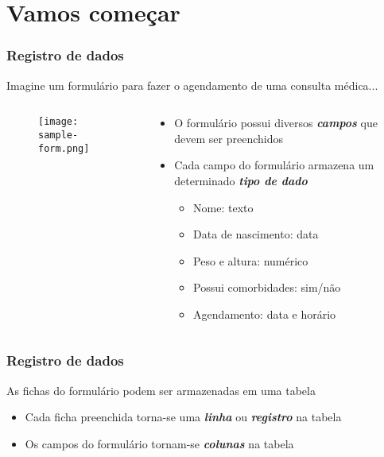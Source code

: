 \documentclass[t, 10pt, aspectratio=169, table, x11names]{beamer}
\begin{document}
	\section{Vamos começar}
	
	\begin{frame}
		\frametitle{Registro de dados}
		\vspace{3mm}
		Imagine um formulário para fazer o agendamento de uma consulta médica...
		\begin{columns}[t]
			\begin{column}{0.50\textwidth}
				\vspace{0.3cm}
				\begin{figure}[h]
					\texttt{[image: sample-form.png]}
				\end{figure}
			\end{column}
			\begin{column}{0.53\textwidth}
				\begin{itemize}					
					\item O formulário possui diversos \textit{\textbf{campos}} que devem ser preenchidos
					\vspace{2mm}
					\item Cada campo do formulário armazena um determinado \textit{\textbf{tipo de dado}}
					\vspace{2mm}
					\begin{itemize}
						\ttfamily\small
						\item Nome: texto
						\item Data de nascimento: data
						\item Peso e altura: numérico
						\item Possui comorbidades: sim/não
						\item Agendamento: data e horário
					\end{itemize}
				\end{itemize}
			\end{column}
			\begin{column}{0.05\textwidth}
			\end{column}
		\end{columns}
	\end{frame}
	
	\begin{frame}
		\frametitle{Registro de dados}
		\vspace{3mm}
		As fichas do formulário podem ser armazenadas em uma tabela 
		\begin{itemize}
			\item Cada ficha preenchida torna-se uma \textbf\textit{linha} ou \textbf{\textit{registro}} na tabela
			\item Os campos do formulário tornam-se \textbf{\textit{colunas}} na tabela
		\end{itemize}		
	\end{frame}
	
\end{document}
